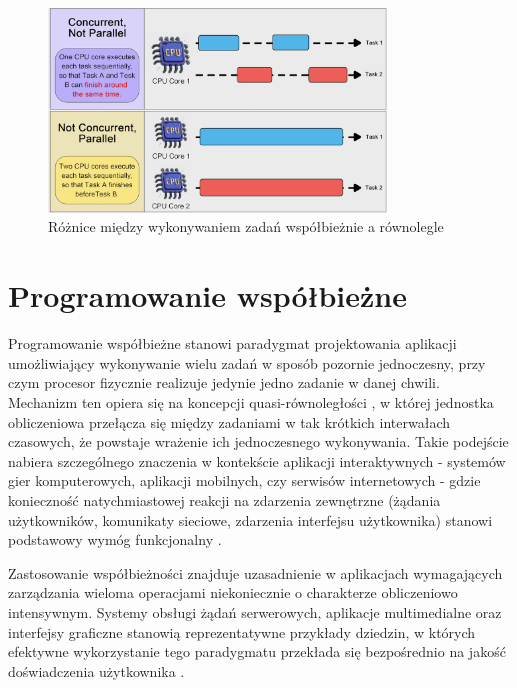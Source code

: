 \begin{figure}[H]
    \centering
    \includegraphics[width=0.8\textwidth]{images/ConcurrentParallelCompare.png}
    \caption{Różnice między wykonywaniem zadań współbieżnie a równolegle \cite{bytebytegoEP108Design}}
    \label{fig:concurrent_vs_parallel}
\end{figure}

\section{Programowanie współbieżne}

Programowanie współbieżne stanowi paradygmat projektowania aplikacji umożliwiający wykonywanie wielu zadań w sposób pozornie jednoczesny, przy czym procesor fizycznie realizuje jedynie jedno zadanie w danej chwili. Mechanizm ten opiera się na koncepcji \mbox{quasi-równoległości} \cite{Paluch}, w której jednostka obliczeniowa przełącza się między zadaniami w tak krótkich interwałach czasowych, że powstaje wrażenie ich jednoczesnego wykonywania. Takie podejście nabiera szczególnego znaczenia w kontekście aplikacji interaktywnych - systemów gier komputerowych, aplikacji mobilnych, czy serwisów internetowych - gdzie konieczność natychmiastowej reakcji na zdarzenia zewnętrzne (żądania użytkowników, komunikaty sieciowe, zdarzenia interfejsu użytkownika) stanowi podstawowy wymóg funkcjonalny \cite{MasteringConcurrencyAndParallelProgramming}.

Zastosowanie współbieżności znajduje uzasadnienie w aplikacjach wymagających zarządzania wieloma operacjami niekoniecznie o charakterze obliczeniowo intensywnym. Systemy obsługi żądań serwerowych, aplikacje multimedialne oraz interfejsy graficzne stanowią reprezentatywne przykłady dziedzin, w których efektywne wykorzystanie tego paradygmatu przekłada się bezpośrednio na jakość doświadczenia użytkownika \cite{IntroductionToConcurrencyAndParallelism}.


